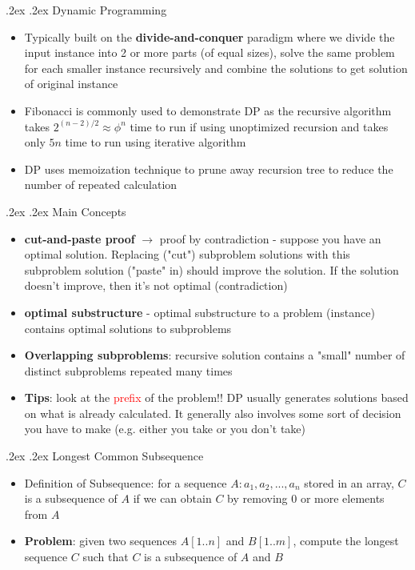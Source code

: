 \documentclass[10pt,landscape,a4paper]{article}
\makeatletter
\renewcommand{\section}{\@startsection{section}{1}{0mm}%
    {.2ex}%
    {.2ex}%
    {\color{myblue}\sffamily\small\bfseries}}
\renewcommand{\subsection}{\@startsection{subsection}{1}{0mm}%
    {.2ex}%
    {.2ex}%
    {\sffamily\bfseries}}
\makeatother
\begin{document}
\abovedisplayskip=0pt
\abovedisplayshortskip=0pt
\belowdisplayskip=0pt
\belowdisplayshortskip=0pt
\tiny
\begin{multicols*}{4}
	\raggedcolumns
	\section{Dynamic Programming}
	\begin{itemize}
		\item Typically built on the \textbf{divide-and-conquer} paradigm where we divide the input instance into 2 or more parts (of equal sizes), solve the same problem for each smaller instance recursively and combine the solutions to get solution of original instance
		\item Fibonacci is commonly used to demonstrate DP as the recursive algorithm takes $2^{(n-2)/2} \approx \phi^n$ time to run if using unoptimized recursion and takes only $5n$ time to run using iterative algorithm
		\item DP uses memoization technique to prune away recursion tree to reduce the number of repeated calculation
	\end{itemize}
	\subsection{Main Concepts}
	\begin{itemize}
		\item \textbf{cut-and-paste proof} $\rightarrow$ proof by contradiction - suppose you have an optimal solution. Replacing ("cut") subproblem solutions with this subproblem solution ("paste" in) should improve the solution. If the solution doesn’t improve, then it’s
		      not optimal (contradiction)
		\item \textbf{optimal substructure} - optimal substructure to a problem (instance) contains optimal solutions to subproblems
		\item \textbf{Overlapping subproblems}: recursive solution contains a "small" number of distinct subproblems repeated many times
		\item \textbf{Tips}: look at the \textcolor{red}{prefix} of the problem!! DP usually generates solutions based on what is already calculated. It generally also involves some sort of decision you have to make (e.g. either you take or you don't take)
	\end{itemize}
	\subsection{Longest Common Subsequence}
	\begin{itemize}
		\item Definition of Subsequence: for a sequence $A : a_1,a_2,...,a_n$ stored in an array, $C$ is a subsequence of $A$ if we can obtain $C$ by removing 0 or more elements from $A$
		\item \textbf{Problem}: given two sequences $A[1..n]$ and $B[1..m]$,
		      compute the longest sequence $C$ such that $C$ is a subsequence of $A$ and $B$
	\end{itemize}

\end{multicols*}
\end{document}
